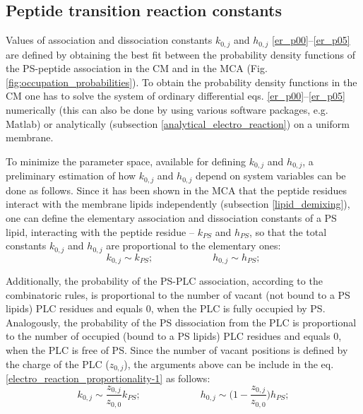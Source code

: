 \subsection{Peptide transition reaction constants}

\label{reaction_constants}

Values of association and dissociation constants $k_{0,j}$ and $h_{0,j}$ \eqref{er_p00}--\eqref{er_p05} are defined by obtaining the best fit between the probability density functions of the PS-peptide association in the CM and in the MCA (Fig. \ref{fig:occupation_probabilities}). To obtain the probability density functions in the CM one has to solve the system of ordinary differential eqs. \eqref{er_p00}--\eqref{er_p05} numerically (this can also be done by using various software packages, e.g. Matlab) or analytically (subsection \ref{analytical_electro_reaction}) on a uniform membrane. 

To minimize the parameter space, available for defining $k_{0,j}$ and $h_{0,j}$, a preliminary estimation of how $k_{0,j}$ and $h_{0,j}$ depend on system variables can be done as follows. Since it has been shown in the MCA that the peptide residues interact with the membrane lipids independently (subsection \ref{lipid_demixing}), one can define the elementary association and dissociation constants of a PS lipid, interacting with the peptide residue -- $k_{PS}$ and $h_{PS}$, so that the total constants $k_{0,j}$ and $h_{0,j}$ are proportional to the elementary ones:
\begin{equation}
 \label{electro_reaction_proportionality-1}k_{0,j}\sim k_{PS}; \hspace{1in} h_{0,j}\sim h_{PS};
\end{equation}

Additionally, the probability of the PS-PLC association, according to the combinatoric rules, is proportional to the number of vacant (not bound to a PS lipids) PLC residues and equals 0, when the PLC is fully occupied by PS. Analogously, the probability of the PS dissociation from the PLC is proportional to the number of occupied (bound to a PS lipids) PLC residues and equals 0, when the PLC is free of PS. Since the number of vacant positions is defined by the charge of the PLC ($z_{0,j}$), the arguments above can be include in the eq. \eqref{electro_reaction_proportionality-1} as follows:
\begin{equation}
 \label{electro_reaction_proportionality0}k_{0,j}\sim\frac{z_{0,j}}{z_{0,0}}k_{PS}; \hspace{1in} h_{0,j}\sim\Big(1 - \frac{z_{0,j}}{z_{0,0}}\Big)h_{PS};
\end{equation}

